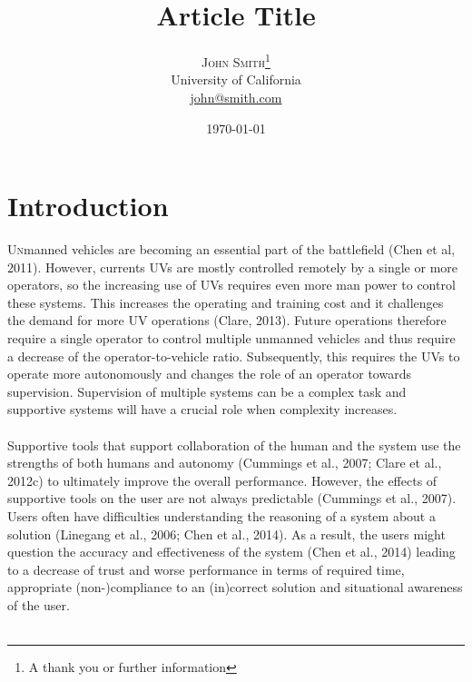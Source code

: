 \documentclass[twoside,twocolumn]{article}
\title{Article Title} %
\author{%
\textsc{John Smith}\thanks{A thank you or further information} \\[1ex] %
\normalsize University of California \\ %
\normalsize \href{mailto:john@smith.com}{john@smith.com} %
}
\date{\today} %
\begin{document}
\maketitle


\section{Introduction}


\lettrine[nindent=0em,lines=3]{U}nmanned vehicles are becoming an essential part of the battlefield (Chen et al, 2011). However, currents UVs are mostly controlled remotely by a single or more operators, so the increasing use of UVs requires even more man power to control these systems. This increases the operating and training cost and it challenges the demand for more UV operations (Clare, 2013). Future operations therefore require a single operator to control multiple unmanned vehicles and thus require a decrease of the operator-to-vehicle ratio. Subsequently, this requires the UVs to operate more autonomously and changes the role of an operator towards supervision. Supervision of multiple systems can be a complex task and supportive systems will have a crucial role when complexity increases.
\\\\
Supportive tools that support collaboration of the human and the system use the strengths of both humans and autonomy (Cummings et al., 2007; Clare et al., 2012c) to ultimately improve the overall performance. However, the effects of supportive tools on the user are not always predictable (Cummings et al., 2007). Users often have difficulties understanding the reasoning of a system about a solution (Linegang et al., 2006; Chen et al., 2014). As a result, the users might question the accuracy and effectiveness of the system (Chen et al., 2014) leading to a decrease of trust and worse performance in terms of required time, appropriate (non-)compliance to an (in)correct solution and situational awareness of the user. 
\\\\
\end{document}
